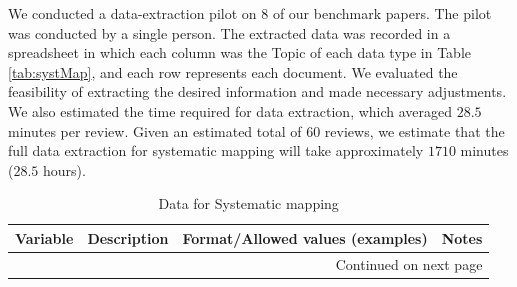 \documentclass{article}
\begin{document}
We conducted a data-extraction pilot on $8$ of our benchmark papers. The pilot was conducted by a single person. The extracted data was recorded in a spreadsheet in which each column was the Topic of each data type in Table \ref{tab:systMap}, and each row represents each document. We evaluated the feasibility of extracting the desired information and made necessary adjustments. We also estimated the time required for data extraction, which averaged $28.5$ minutes per review. Given an estimated total of $60$ reviews, we estimate that the full data extraction for systematic mapping will take approximately $1710$ minutes ($28.5$ hours).

    \begin{longtable}{p{1.5cm}|p{3cm}|p{3cm}|p{3cm}}
    \caption{Data for Systematic mapping}\\
        \hline
         \textbf{Variable} & \textbf{Description} & \textbf{Format/Allowed values (examples) } & \textbf{Notes}\\
         \hline
         \endhead

         \multicolumn{4}{r}{Continued on next page}
         \endfoot

         \multicolumn{4}{r}{End of Table}
         \endlastfoot
         

\end{longtable}
\end{document}
